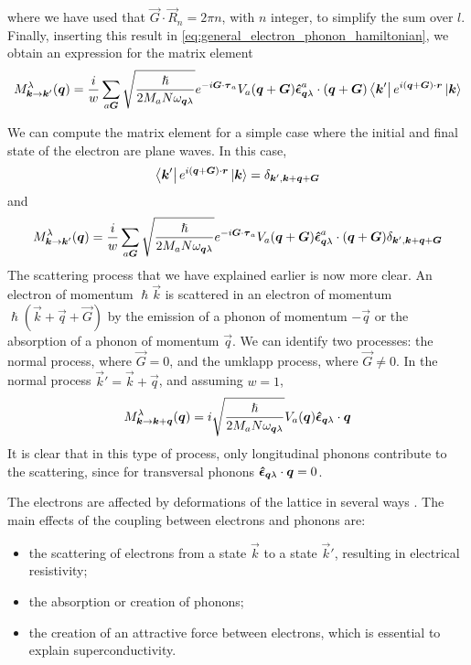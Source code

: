 where we have used that $\vec{G} \cdot \vec{R}_n = 2\pi n$, with $n$ integer, to simplify the sum over $l$. Finally, inserting this result in \cref{eq:general_electron_phonon_hamiltonian}, we obtain an expression for the matrix element
\begin{equation}
    M_{\mathbf{\boldsymbol{k}} \rightarrow \mathbf{\boldsymbol{k}}'}^\lambda(\mathbf{\boldsymbol{q}}) =  \frac{i}{w} \sum_{a\mathbf{\boldsymbol{G}}} \sqrt{\frac{\hslash}{2M_aN\omega_{\mathbf{\boldsymbol{q}}\lambda}}}  e^{-i \mathbf{\boldsymbol{G}} \cdot \mathbf{\boldsymbol{\tau}}_a} V_a(\mathbf{\boldsymbol{q}} + \mathbf{\boldsymbol{G}}) \mathbf{\boldsymbol{\hat{\epsilon}}}_{\mathbf{\boldsymbol{q}}\lambda}^a \cdot (\mathbf{\boldsymbol{q}}+\mathbf{\boldsymbol{G}}) \bra{\mathbf{\boldsymbol{k}}'} e^{i(\mathbf{\boldsymbol{q}} + \mathbf{\boldsymbol{G}})\cdot \mathbf{\boldsymbol{r}}} \ket{\mathbf{\boldsymbol{k}}}
\end{equation}

We can compute the matrix element for a simple case where the initial and final state of the electron are plane waves. In this case,
\begin{equation} \label{eq:plane_waves}
    \bra{\mathbf{\boldsymbol{k}}'} e^{i(\mathbf{\boldsymbol{q}} + \mathbf{\boldsymbol{G}})\cdot \mathbf{\boldsymbol{r}}} \ket{\mathbf{\boldsymbol{k}}} = \delta_{\mathbf{\boldsymbol{k}}', \mathbf{\boldsymbol{k}}+\mathbf{\boldsymbol{q}}+\mathbf{\boldsymbol{G}}}
\end{equation}
and
\begin{equation}
    M_{\mathbf{\boldsymbol{k}} \rightarrow \mathbf{\boldsymbol{k}}'}^\lambda(\mathbf{\boldsymbol{q}}) =  \frac{i}{w} \sum_{a\mathbf{\boldsymbol{G}}} \sqrt{\frac{\hslash}{2M_aN\omega_{\mathbf{\boldsymbol{q}}\lambda}}}  e^{-i \mathbf{\boldsymbol{G}} \cdot \mathbf{\boldsymbol{\tau}}_a} V_a(\mathbf{\boldsymbol{q}} + \mathbf{\boldsymbol{G}}) \mathbf{\boldsymbol{\hat{\epsilon}}}_{\mathbf{\boldsymbol{q}}\lambda}^a \cdot (\mathbf{\boldsymbol{q}}+\mathbf{\boldsymbol{G}}) \delta_{\mathbf{\boldsymbol{k}}', \mathbf{\boldsymbol{k}}+\mathbf{\boldsymbol{q}}+\mathbf{\boldsymbol{G}}}
\end{equation}
The scattering process that we have explained earlier is now more clear. An electron of momentum $\hslash\vec{k}$ is scattered in an electron of momentum $\hslash (\vec{k}+\vec{q}+\vec{G})$ by the emission of a phonon of momentum $-\vec{q}$ or the absorption of a phonon of momentum $\vec{q}$. We can identify two processes: the normal process, where $\vec{G} = 0$, and the umklapp process, where $\vec{G} \neq 0$. In the normal process $\vec{k}' = \vec{k} + \vec{q}$, and assuming $w=1$,
\begin{equation} \label{eq:phonon_matrix_normal}
    M_{\mathbf{\boldsymbol{k}} \rightarrow \mathbf{\boldsymbol{k}} + \mathbf{\boldsymbol{q}}}^\lambda(\mathbf{\boldsymbol{q}}) =  i \sqrt{\frac{\hslash}{2M_aN\omega_{\mathbf{\boldsymbol{q}}\lambda}}}   V_a(\mathbf{\boldsymbol{q}}) \mathbf{\boldsymbol{\hat{\epsilon}}}_{\mathbf{\boldsymbol{q}}\lambda} \cdot \mathbf{\boldsymbol{q}}
\end{equation}
It is clear that in this type of process, only longitudinal phonons contribute to the scattering, since for transversal phonons $\mathbf{\boldsymbol{\hat{\epsilon}}}_{\mathbf{\boldsymbol{q}}\lambda} \cdot \mathbf{\boldsymbol{q}} = 0$.

The electrons are affected by deformations of the lattice in several ways \cite{kittel1987}. The main effects of the coupling between  electrons and phonons are:
\begin{itemize}
    \item the scattering of electrons from a state $\vec{k}$ to a state $\vec{k}'$, resulting in electrical resistivity;
    \item the absorption or creation of phonons;
    \item the creation of an attractive force between electrons, which is essential to explain superconductivity.
\end{itemize}

